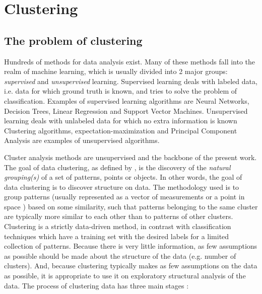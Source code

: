 
\chapter{Clustering}
\label{chapter:clustering}

\section{The problem of clustering}
\label{sec:clustering}


Hundreds of methods for data analysis exist.
Many of these methods fall into the realm of machine learning, which is usually divided into 2 major groups: \textit{supervised} and \textit{unsupervised} learning.
Supervised learning deals with labeled data, i.e. data for which ground truth is known, and tries to solve the problem of classification.
Examples of supervised learning algorithms are Neural Networks, Decision Trees, Linear Regression and Support Vector Machines. %
Unsupervised learning deals with unlabeled data for which no extra information is known
Clustering algorithms, expectation-maximization and Principal Component Analysis are examples of unsupervised algorithms. %

Cluster analysis methods are unsupervised and the backbone of the present work.
The goal of data clustering, as defined by \cite{Jain2010}, is the discovery of the \textit{natural grouping(s)} of a set of patterns, points or objects.
In other words, the goal of data clustering is to discover structure on data.
The methodology used is to group patterns (usually represented as a vector of measurements or a point in space \cite{Jain1999}) based on some similarity, such that patterns belonging to the same cluster are typically more similar to each other than to patterns of other clusters.
Clustering is a strictly data-driven method, in contrast with classification techniques which have a training set with the desired labels for a limited collection of patterns.
Because there is very little information, as few assumptions as possible should be made about the structure of the data (e.g. number of clusters).
And, because clustering typically makes as few assumptions on the data as possible, it is appropriate to use it on exploratory structural analysis of the data.
The process of clustering data has three main stages \cite{Jain1999}:

